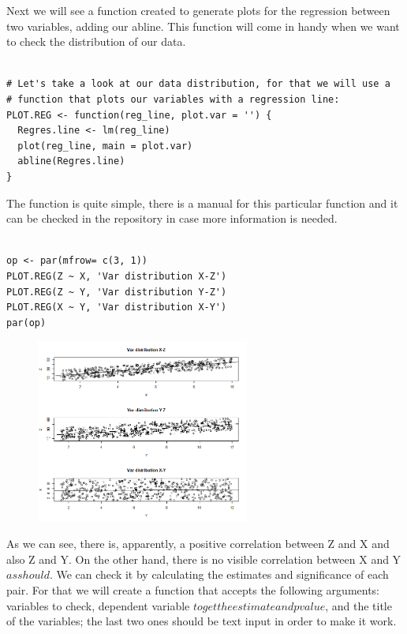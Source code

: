 \documentclass{article}
\begin{document}
Next we will see a function created to generate plots for the regression between
two variables, adding our abline. This function will come in handy when we want
to check the distribution of our data.



\begin{lstlisting}

# Let's take a look at our data distribution, for that we will use a 
# function that plots our variables with a regression line:
PLOT.REG <- function(reg_line, plot.var = '') {
  Regres.line <- lm(reg_line)
  plot(reg_line, main = plot.var)
  abline(Regres.line)
}

\end{lstlisting}

The function is quite simple, there is a manual for this particular function 
and it can be checked in the repository in case more information is needed.



\begin{lstlisting}

op <- par(mfrow= c(3, 1))
PLOT.REG(Z ~ X, 'Var distribution X-Z')
PLOT.REG(Z ~ Y, 'Var distribution Y-Z')
PLOT.REG(X ~ Y, 'Var distribution X-Y')
par(op)

\end{lstlisting}


\begin{figure}[h]
\includegraphics[width=7cm]{PLOT_CASE1.png}
\centering
\end{figure}


As we can see, there is, apparently, a positive correlation between Z and X and also
Z and Y. On the other hand, there is no visible correlation between X and Y 
\(as should\). We can check it by calculating the estimates and significance of
each pair. For that we will create a function that accepts the following 
arguments: variables to check, dependent variable \(to get the estimate and
p value\), and the title of the variables; the last two ones should be text
input in order to make it work.
\end{document}
